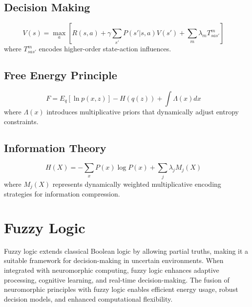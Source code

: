 \documentclass{article}
\theoremstyle{plain}
\begin{document}
\begin{itemize}
\begin{itemize}
\subsection{Decision Making}
\begin{equation}
    V(s) = \max_a \left[ R(s, a) + \gamma \sum_{s'} P(s'|s, a)V(s') 
    + \sum_{m} \lambda_m T_{s a s'}^m \right] 
    \quad 
\end{equation}
where $T_{s a s'}^m$ encodes higher-order state-action influences.

\subsection{Free Energy Principle}
\begin{equation}
    F = E_q[\ln p(x, z)] - H(q(z)) + \int \Lambda(x) dx 
    \quad 
\end{equation}
where $\Lambda(x)$ introduces multiplicative priors that dynamically adjust entropy constraints.

\subsection{Information Theory}
\begin{equation}
    H(X) = -\sum_{x} P(x)\log P(x) + \sum_{j} \lambda_j M_j(X) 
    \quad 
\end{equation}
where $M_j(X)$ represents dynamically weighted multiplicative encoding strategies for information compression.

\section{Fuzzy Logic}

Fuzzy logic extends classical Boolean logic by allowing partial truths, making it a suitable framework for decision-making in uncertain environments. When integrated with neuromorphic computing, fuzzy logic enhances adaptive processing, cognitive learning, and real-time decision-making. The fusion of neuromorphic principles with fuzzy logic enables efficient energy usage, robust decision models, and enhanced computational flexibility.


\end{itemize}
\end{itemize}
\end{document}

